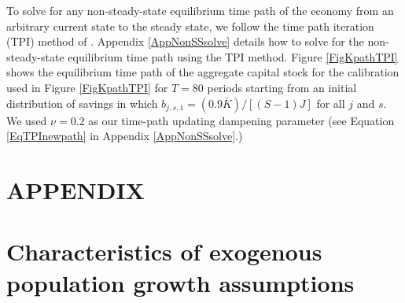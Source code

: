 \documentclass[letterpaper,12pt]{article}
\theoremstyle{definition}
\begin{document}
\begin{spacing}{1.5}
    To solve for any non-steady-state equilibrium time path of the economy from an arbitrary current state to the steady state, we follow the time path iteration (TPI) method of \citet{AuerbachKotlikoff:1987}. Appendix \ref{AppNonSSsolve} details how to solve for the non-steady-state equilibrium time path using the TPI method. Figure \ref{FigKpathTPI} shows the equilibrium time path of the aggregate capital stock for the calibration used in Figure \ref{FigKpathTPI} for $T=80$ periods starting from an initial distribution of savings in which $b_{j,s,1}=(0.9\bar{K})/[(S-1)J]$ for all $j$ and $s$. We used $\nu=0.2$ as our time-path updating dampening parameter (see Equation \eqref{EqTPInewpath} in Appendix \ref{AppNonSSsolve}.)


\clearpage

\end{spacing}

\newpage
\renewcommand{\theequation}{A.\arabic{section}.\arabic{equation}}
\renewcommand{\thesection}{A-\arabic{section}}   %
\setcounter{equation}{0}                         %
\setcounter{section}{0}                          %
\section*{APPENDIX}                              %


\section{Characteristics of exogenous population growth assumptions}\label{AppPopGrowth}
\end{document}
